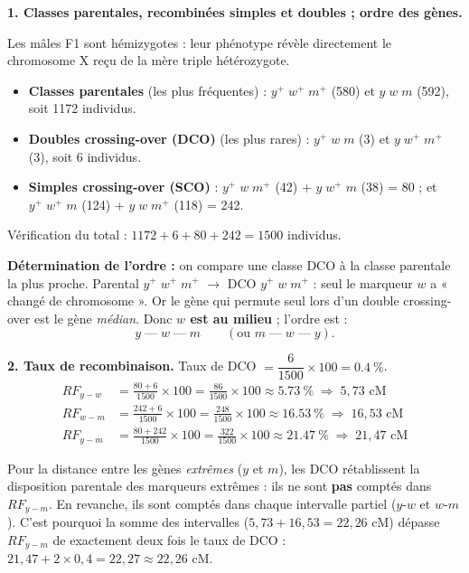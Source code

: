 \documentclass[11pt]{article}
\begin{document}
\begin{corrige}
\textbf{1. Classes parentales, recombinées simples et doubles ; ordre des gènes.}

Les mâles F1 sont hémizygotes : leur phénotype révèle directement le chromosome X reçu de la mère triple hétérozygote.
\begin{itemize}
    \item \textbf{Classes parentales} (les plus fréquentes) : $y^+\;w^+\;m^+$ (580) et $y\;w\;m$ (592), soit 1172 individus.
    \item \textbf{Doubles crossing-over (DCO)} (les plus rares) : $y^+\;w\;m$ (3) et $y\;w^+\;m^+$ (3), soit 6 individus.
    \item \textbf{Simples crossing-over (SCO)} : $y^+\;w\;m^+$ (42) + $y\;w^+\;m$ (38) = 80 ; et $y^+\;w^+\;m$ (124) + $y\;w\;m^+$ (118) = 242.
\end{itemize}
Vérification du total : $1172 + 6 + 80 + 242 = 1500$ individus.

\textbf{Détermination de l'ordre :} on compare une classe DCO à la classe parentale la plus proche. Parental $y^+\;w^+\;m^+$ $\rightarrow$ DCO $y^+\;w\;m^+$ : seul le marqueur $w$ a « changé de chromosome ». Or le gène qui permute seul lors d'un double crossing-over est le gène \emph{médian}. Donc \textbf{$w$ est au milieu} ; l'ordre est :
\[ y \;—\; w \;—\; m \qquad (\text{ou } m \;—\; w \;—\; y). \]

\textbf{2. Taux de recombinaison.} Taux de DCO $= \dfrac{6}{1500} \times 100 = \SI{0,4}{\percent}$.
\begin{align*}
RF_{y-w} &= \frac{80 + 6}{1500} \times 100 = \frac{86}{1500} \times 100 \approx \SI{5,73}{\percent} \;\Rightarrow\; 5,73 \text{ cM} \\
RF_{w-m} &= \frac{242 + 6}{1500} \times 100 = \frac{248}{1500} \times 100 \approx \SI{16,53}{\percent} \;\Rightarrow\; 16,53 \text{ cM} \\
RF_{y-m} &= \frac{80 + 242}{1500} \times 100 = \frac{322}{1500} \times 100 \approx \SI{21,47}{\percent} \;\Rightarrow\; 21,47 \text{ cM}
\end{align*}

\begin{attention}
Pour la distance entre les gènes \emph{extrêmes} ($y$ et $m$), les DCO rétablissent la disposition parentale des marqueurs extrêmes : ils ne sont \textbf{pas} comptés dans $RF_{y-m}$. En revanche, ils sont comptés dans chaque intervalle partiel ($y$-$w$ et $w$-$m$). C'est pourquoi la somme des intervalles ($5,73 + 16,53 = 22,26$ cM) dépasse $RF_{y-m}$ de exactement deux fois le taux de DCO : $21,47 + 2 \times 0,4 = 22,27 \approx 22,26$ cM.
\end{attention}


\end{corrige}
\end{document}
